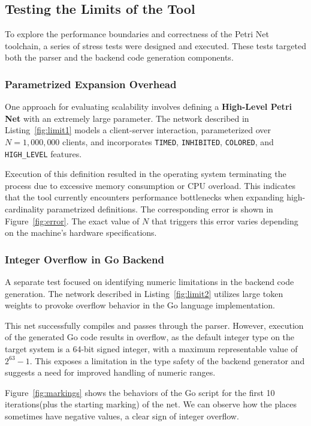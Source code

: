 \documentclass[12pt]{article}
\begin{document}
    \subsection{Testing the Limits of the Tool}   
        To explore the performance boundaries and correctness of the Petri Net toolchain, a series of stress tests were designed and executed. These tests targeted both the parser and the backend code generation components.
        \subsubsection{Parametrized Expansion Overhead}
            One approach for evaluating scalability involves defining a \textbf{High-Level Petri Net} with an extremely large parameter. The network described in Listing~\ref{fig:limit1} models a client-server interaction, parameterized over $N = 1{,}000{,}000$ clients, and incorporates \texttt{TIMED}, \texttt{INHIBITED}, \texttt{COLORED}, and \texttt{HIGH\_LEVEL} features.

            Execution of this definition resulted in the operating system terminating the process due to excessive memory consumption or CPU overload. This indicates that the tool currently encounters performance bottlenecks when expanding high-cardinality parametrized definitions. The corresponding error is shown in Figure~\ref{fig:error}. The exact value of $N$ that triggers this error varies depending on the machine's hardware specifications.

        \subsubsection{Integer Overflow in Go Backend}
            A separate test focused on identifying numeric limitations in the backend code generation. The network described in Listing~\ref{fig:limit2} utilizes large token weights to provoke overflow behavior in the Go language implementation.

            This net successfully compiles and passes through the parser. However, execution of the generated Go code results in overflow, as the default integer type on the target system is a 64-bit signed integer, with a maximum representable value of $2^{63} - 1$. This exposes a limitation in the type safety of the backend generator and suggests a need for improved handling of numeric ranges.

            Figure~\ref{fig:markings} shows the behaviors of the Go script for the first 10 iterations(plus the starting marking) of the net. We can observe how the places sometimes have negative values, a clear sign of integer overflow.
\end{document}
